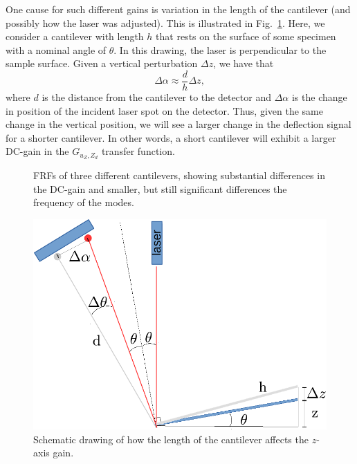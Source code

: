 \documentclass[twocolumn,twoside]{IEEEtran/IEEEtran}
\begin{document}
One cause for such different gains is variation in the length of the cantilever
(and possibly how the laser was adjusted). This is illustrated in
Fig.~\ref{fig:z_axis_gain}. Here, we consider a cantilever with length $h$ that
rests on the surface of some specimen with a nominal angle of $\theta$. In this
drawing, the laser is perpendicular to the sample surface. Given a vertical
perturbation $\Delta z$, we have that
\begin{equation}
  \Delta \alpha \approx \frac{d}{h} \Delta z,
\end{equation}
where $d$ is the distance from the cantilever to the detector and
$\Delta \alpha$ is the change in position of the incident laser spot on the
detector. Thus, given the same change in the vertical position, we will see a
larger change in the deflection signal for a shorter cantilever. In other words,
a short cantilever will exhibit a larger DC-gain in the $G_{u_Z,Z_d}$ transfer
function.
\begin{figure}
  \begin{minipage}[t]{.46\textwidth}
    
    \caption{FRFs of three different cantilevers, showing substantial
      differences in the DC-gain and smaller, but still significant differences
      the frequency of the modes.}
    \label{fig:z_evolution}
  \end{minipage}
  \hfill
  \begin{minipage}[t]{.46\textwidth}
    \includegraphics[width=1\textwidth]{figures/z_axis_gain_schematic-crop.pdf}
    \caption{Schematic drawing of how the length of the cantilever affects the
      $z$-axis gain.}
    \label{fig:z_axis_gain}
  \end{minipage}
\end{figure}
\end{document}
